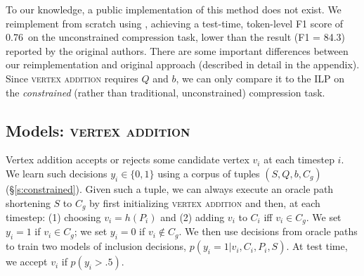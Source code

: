 \documentclass[11pt,a4paper]{article}
\newcommand{\ilptest}[0]{0.76~}
\begin{document}
To our knowledge, a public implementation of this method does not exist. We reimplement from scratch using \citet{gurobi}, achieving a test-time, token-level F1 score of \ilptest on the unconstrained compression task, lower than the result {\small (F1 = 84.3)} reported by the original authors. There are some important differences between our reimplementation and original approach (described in detail in the appendix). Since \textsc{vertex addition} requires $Q$ and $b$, we can only compare it to the ILP on the \textit{constrained} (rather than traditional, unconstrained) compression task.

\subsection{Models: \textsc{vertex addition}}\label{s:transition}

Vertex addition accepts or rejects some candidate vertex $v_i$ at each timestep $i$. 
We learn such decisions $y_i \in \{0,1\}$ using a corpus of tuples $(S,Q,b,C_g)$ (\S\ref{s:constrained}). Given such a tuple, we can always execute an oracle path shortening $S$ to $C_g$ by first initializing \textsc{vertex addition} and then, at each timestep: (1) choosing $v_i = h(P_i)$ and (2) adding $v_i$ to $C_i$ iff $v_i \in C_g$. We set $y_i=1$ if $v_i \in C_g$; we set $y_i=0$ if $v_i \notin C_g$. We then use decisions from oracle paths to train two models of inclusion decisions, ${p(y_i  = 1 | v_i, C_i, P_i, S)}$. At test time, we accept $v_i$ if $p(y_i > .5)$.
\end{document}
